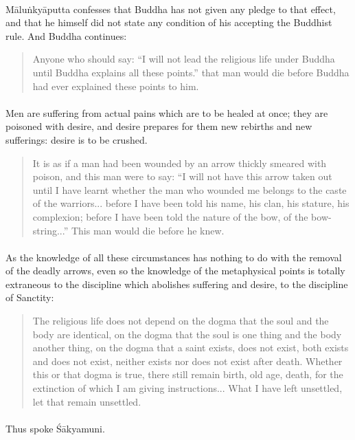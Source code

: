\documentclass[a4paper, 11pt, oneside, english]{article}
\begin{document}
\paragraph{}
Māluṅkyāputta confesses that Buddha has not given any pledge to that effect, and that he himself did not state any condition of his accepting the Buddhist rule. And Buddha continues:
\begin{quotation}
\small
Anyone who should say: ``I will not lead the religious life under Buddha until Buddha explains all these points.'' that man would die before Buddha had ever explained these points to him.
\end{quotation}
\paragraph{}
Men are suffering from actual pains which are to be healed at once; they are poisoned with desire, and desire prepares for them new rebirths and new sufferings: desire is to be crushed.
\begin{quotation}
\small
It is as if a man had been wounded by an arrow thickly smeared with poison, and this man were to say: ``I will not have this arrow taken out until I have learnt whether the man who wounded me belongs to the caste of the warriors... before I have been told his name, his clan, his stature, his complexion; before I have been told the nature of the bow, of the bow-string...'' This man would die before he knew.
\end{quotation}
\paragraph{}
As the knowledge of all these circumstances has nothing to do with the removal of the deadly arrows, even so the knowledge of the metaphysical points is totally extraneous to the discipline which abolishes suffering and desire, to the discipline of Sanctity:
\begin{quotation}
\small
The religious life does not depend on the dogma that the soul and the body are identical, on the dogma that the soul is one thing and the body another thing, on the dogma that a saint exists, does not exist, both exists and does not exist, neither exists nor does not exist after death. Whether this or that dogma is true, there still remain birth, old age, death, for the extinction of which I am giving instructions... What I have left unsettled, let that remain unsettled.
\end{quotation}
\paragraph{}
Thus spoke Śākyamuni.
\end{document}
